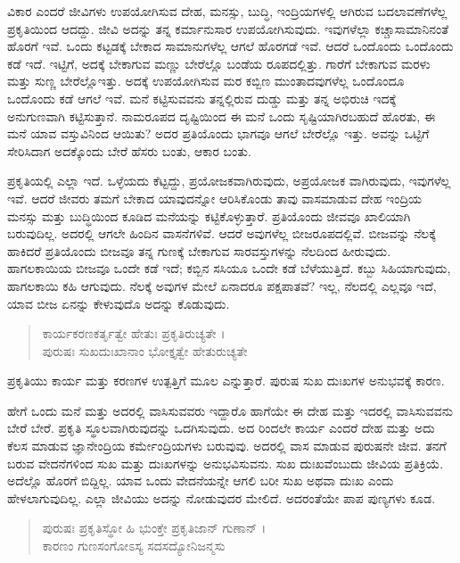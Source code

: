 ವಿಕಾರ ಎಂದರೆ ಜೀವಿಗಳು ಉಪಯೋಗಿಸುವ ದೇಹ, ಮನಸ್ಸು, ಬುದ್ಧಿ, ಇಂದ್ರಿಯಗಳಲ್ಲಿ ಆಗಿರುವ ಬದಲಾವಣೆಗಳೆಲ್ಲ ಪ್ರಕೃತಿಯಿಂದ ಆದದ್ದು. ಜೀವಿ ಅದನ್ನು ತನ್ನ ಕರ್ಮಾನುಸಾರ ಉಪಯೋಗಿಸುವುದು. ಇವುಗಳೆಲ್ಲಾ ಕಚ್ಚಾಸಾಮಾನಿನಂತೆ ಹೊರಗೆ ಇವೆ. ಒಂದು ಕಟ್ಟಡಕ್ಕೆ ಬೇಕಾದ ಸಾಮಾನುಗಳೆಲ್ಲ ಆಗಲೆ ಹೊರಗಡೆ ಇವೆ. ಆದರೆ ಒಂದೊಂದು ಒಂದೊಂದು ಕಡೆ ಇದೆ. ಇಟ್ಟಿಗೆ, ಅದಕ್ಕೆ ಬೇಕಾಗುವ ಮಣ್ಣು ಬೇರೆಲ್ಲೊ ಬಂಡೆಯ ರೂಪದಲ್ಲಿತ್ತು. ಗಾರೆಗೆ ಬೇಕಾಗುವ ಮರಳು ಮತ್ತು ಸುಣ್ಣ ಬೇರೆಲ್ಲೊಇತ್ತು. ಅದಕ್ಕೆ ಉಪಯೋಗಿಸುವ ಮರ ಕಬ್ಬಿಣ ಮುಂತಾದವುಗಳೆಲ್ಲ ಒಂದೊಂದೂ ಒಂದೊಂದು ಕಡೆ ಆಗಲೆ ಇವೆ. ಮನೆ ಕಟ್ಟಿಸುವವನು ತನ್ನಲ್ಲಿರುವ ದುಡ್ಡು ಮತ್ತು ತನ್ನ ಅಭಿರುಚಿ ಇದಕ್ಕೆ ಅನುಗುಣವಾಗಿ ಕಟ್ಟಿಸುತ್ತಾನೆ. ನಾಮರೂಪದ ದೃಷ್ಟಿಯಿಂದ ಈ ಮನೆ ಒಂದು ಸೃಷ್ಟಿಯಾಗಿರಬಹುದೆ ಹೊರತು, ಈ ಮನೆ ಯಾವ ವಸ್ತುವಿನಿಂದ ಆಯಿತು? ಅದರ ಪ್ರತಿಯೊಂದು ಭಾಗವೂ ಆಗಲೆ ಬೇರೆಲ್ಲೊ ಇತ್ತು. ಅವನ್ನು ಒಟ್ಟಿಗೆ ಸೇರಿಸಿದಾಗ ಅದಕ್ಕೊಂದು ಬೇರೆ ಹೆಸರು ಬಂತು, ಆಕಾರ ಬಂತು.

ಪ್ರಕೃತಿಯಲ್ಲಿ ಎಲ್ಲಾ ಇದೆ. ಒಳ್ಳೆಯದು ಕೆಟ್ಟದ್ದು, ಪ್ರಯೋಜಕವಾಗಿರುವುದು, ಅಪ್ರಯೋಜಕ ವಾಗಿರುವುದು, ಇವುಗಳೆಲ್ಲ ಇವೆ. ಆದರೆ ಜೀವರು ತಮಗೆ ಬೇಕಾದ ಯಾವುದನ್ನೋ ಆರಿಸಿಕೊಂಡು ತಾವು ವಾಸಮಾಡುವ ದೇಹ ಇಂದ್ರಿಯ ಮನಸ್ಸು ಮತ್ತು ಬುದ್ಧಿಯಿಂದ ಕೂಡಿದ ಮನೆಯನ್ನು ಕಟ್ಟಿಕೊಳ್ಳುತ್ತಾರೆ. ಪ್ರತಿಯೊಂದು ಜೀವವೂ ಖಾಲಿಯಾಗಿ ಬರುವುದಿಲ್ಲ. ಅದರಲ್ಲಿ ಆಗಲೇ ಹಿಂದಿನ ವಾಸನೆಗಳಿವೆ. ಆದರೆ ಅವುಗಳೆಲ್ಲ ಬೀಜರೂಪದಲ್ಲಿವೆ. ಬೀಜವನ್ನು ನೆಲಕ್ಕೆ ಹಾಕಿದರೆ ಪ್ರತಿಯೊಂದು ಬೀಜವೂ ತನ್ನ ಗುಣಕ್ಕೆ ಬೇಕಾಗುವ ಸಾರವಸ್ತುಗಳನ್ನು ನೆಲದಿಂದ ಹೀರುವುದು. ಹಾಗಲಕಾಯಿಯ ಬೀಜವೂ ಒಂದೇ ಕಡೆ ಇದೆ; ಕಬ್ಬಿನ ಸಸಿಯೂ ಒಂದೇ ಕಡೆ ಬೆಳೆಯುತ್ತಿದೆ. ಕಬ್ಬು ಸಿಹಿಯಾಗುವುದು, ಹಾಗಲಕಾಯಿ ಕಹಿ ಆಗುವುದು. ನೆಲಕ್ಕೆ ಅವುಗಳ ಮೇಲೆ ಏನಾದರೂ ಪಕ್ಷಪಾತವೆ? ಇಲ್ಲ, ನೆಲದಲ್ಲಿ ಎಲ್ಲವೂ ಇದೆ, ಯಾವ ಬೀಜ ಏನನ್ನು ಕೇಳುವುದೊ ಅದನ್ನು ಕೊಡುವುದು.

\begin{verse}
ಕಾರ್ಯಕರಣಕರ್ತೃತ್ವೇ ಹೇತುಃ ಪ್ರಕೃತಿರುಚ್ಯತೇ ।\\ಪುರುಷಃ ಸುಖದುಃಖಾನಾಂ ಭೋಕ್ತೃತ್ವೇ ಹೇತುರುಚ್ಯತೇ 
\end{verse}

{\small ಪ್ರಕೃತಿಯು ಕಾರ್ಯ ಮತ್ತು ಕರಣಗಳ ಉತ್ಪತ್ತಿಗೆ ಮೂಲ ಎನ್ನುತ್ತಾರೆ. ಪುರುಷ ಸುಖ ದುಃಖಗಳ ಅನುಭವಕ್ಕೆ ಕಾರಣ.}

ಹೇಗೆ ಒಂದು ಮನೆ ಮತ್ತು ಅದರಲ್ಲಿ ವಾಸಿಸುವವರು ಇದ್ದಾರೊ ಹಾಗೆಯೇ ಈ ದೇಹ ಮತ್ತು ಇದರಲ್ಲಿ ವಾಸಿಸುವವನು ಬೇರೆ ಬೇರೆ. ಪ್ರಕೃತಿ ಸ್ಥೂಲವಾಗಿರುವುದನ್ನು ಒದಗಿಸುವುದು. ಅದ ರಿಂದಲೇ ಕಾರ್ಯ ಎಂದರೆ ದೇಹ ಮತ್ತು ಅದು ಕೆಲಸ ಮಾಡುವ ಜ್ಞಾನೇಂದ್ರಿಯ ಕರ್ಮೇಂದ್ರಿಯಗಳು ಬರುವುವು. ಅದರಲ್ಲಿ ವಾಸ ಮಾಡುವ ಪುರುಷನೇ ಜೀವ. ತನಗೆ ಬರುವ ವೇದನೆಗಳಿಂದ ಸುಖ ಮತ್ತು ದುಃಖಗಳನ್ನು ಅನುಭವಿಸುವನು. ಸುಖ ದುಃಖವೆಂಬುದು ಜೀವಿಯ ಪ್ರತಿಕ್ರಿಯೆ. ಅದೆಲ್ಲೊ ಹೊರಗೆ ಬಿದ್ದಿಲ್ಲ. ಯಾವ ಒಂದು ವೇದನೆಯನ್ನೇ ಆಗಲಿ ಬರೀ ಸುಖ ಅಥವಾ ದುಃಖ ಎಂದು ಹೇಳಲಾಗುವುದಿಲ್ಲ. ಎಲ್ಲಾ ಜೀವಿಯು ಅದನ್ನು ನೋಡುವುದರ ಮೇಲಿದೆ. ಅದರಂತೆಯೇ ಪಾಪ ಪುಣ್ಯಗಳು ಕೂಡ.

\begin{verse}
ಪುರುಷಃ ಪ್ರಕೃತಿಸ್ಥೋ ಹಿ ಭುಂಕ್ತೇ ಪ್ರಕೃತಿಜಾನ್ ಗುಣಾನ್ ।\\ಕಾರಣಂ ಗುಣಸಂಗೋಽಸ್ಯ ಸದಸದ್ಯೋನಿಜನ್ಮಸು 
\end{verse}

